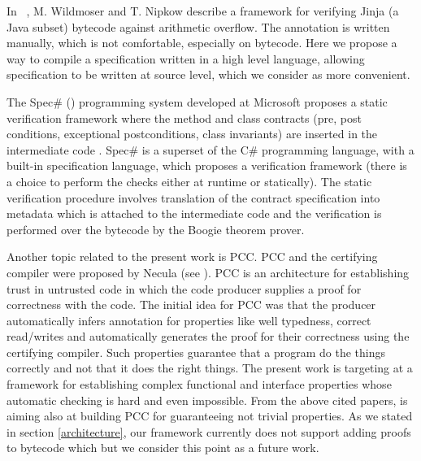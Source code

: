 In ~\cite{WildmoserN-ESOP05}, M. Wildmoser and T. Nipkow describe a framework for verifying Jinja (a Java subset) bytecode 
against arithmetic overflow.  The annotation is written manually, which is not comfortable, especially on bytecode. 
Here we propose a way to compile a specification written in a high level language, allowing specification to be written at source level, which we consider as more convenient.

 The Spec\# (\cite{BLS04sp}) programming system developed at Microsoft proposes a static verification framework where 
 the method and class contracts  (pre, post conditions, exceptional postconditions, class invariants) are inserted in the intermediate code . 
 Spec\# is a superset of the C\# programming language, with a built-in  specification language,
which proposes a verification framework (there is a choice to perform the checks either at runtime or statically). 
 The static verification procedure  involves translation of the contract specification into metadata which is attached to the intermediate code 
 and the verification is performed over the bytecode by the Boogie theorem prover.

Another topic related to the present work is PCC.
 PCC and the certifying compiler were proposed by Necula (see \cite{Necula97,ComNec,DesNecLee98}). PCC is an architecture for establishing trust in untrusted code 
in which the code producer supplies a proof for correctness with the code. 
The initial idea for PCC  was that the producer automatically infers annotation for properties like well typedness, 
correct read/writes and automatically generates the proof for their correctness using the certifying compiler. 
Such properties guarantee that a program do the things correctly and not that it does the right things. The present work is targeting at a
 framework for establishing complex functional and interface properties whose automatic checking is hard and even impossible. 
 From the above cited papers, \cite{BM05plb} is aiming also at building PCC for
 guaranteeing not trivial properties. As we stated in section \ref{architecture}, our framework currently does not support adding proofs to bytecode 
 which but we consider this point as a future work. 
 
